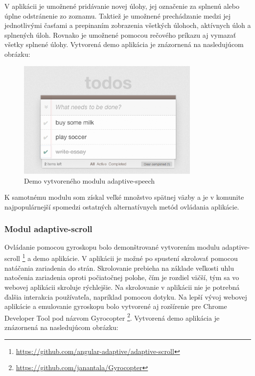 V aplikácii je umožnené pridávanie novej úlohy, jej označenie za splnenú alebo úplne odstránenie zo zoznamu. Taktiež je umožnené prechádzanie medzi jej jednotlivými časťami a prepinaním zobrazenia všetkých úlohoch, aktívnych úloh a splnených úloh. Rovnako je umožnené pomocou rečového príkazu aj vymazať všetky splnené úlohy. Vytvorená demo aplikácia je znázornená na nasledujúcom obrázku:

\begin{figure}[H]
  \centering
  \includegraphics[width=0.8\textwidth]{img/adaptivespeech.png}
  \caption[Demo vytvoreného modulu adaptive-speech]{
    Demo vytvoreného modulu adaptive-speech}
  \label{fig: adaptivespeech}
\end{figure}

K samotnému modulu som získal veľké množstvo spätnej väzby a je v komunite najpopulárnejší spomedzi ostatných alternatívnych metód ovládania aplikácie.


\newpage
\subsubsection{Modul adaptive-scroll} %
\label{sub:adaptive_scroll}

Ovládanie pomocou gyroskopu bolo demonštrované vytvorením modulu adaptive-scroll \footnote{\url{https://github.com/angular-adaptive/adaptive-scroll}} a demo aplikácie. V aplikácii je možné po spustení skrolovať pomocou natáčania zariadenia do strán. Skrolovanie prebieha na základe veľkosti uhlu natočenia zariadenia oproti počiatočnej polohe, čím je rozdiel väčší, tým sa vo webovej aplikácii skroluje rýchlejšie. Na skrolovanie v aplikácii nie je potrebná ďalšia interakcia používateľa, napríklad pomocou dotyku. Na lepší vývoj webovej aplikácie a emulovanie gyroskopu bolo vytvorené aj rozšírenie pre Chrome Developer Tool pod názvom Gyrocopter \footnote{\url{https://github.com/janantala/Gyrocopter}}. Vytvorená demo aplikácia je znázornená na nasledujúcom obrázku:

